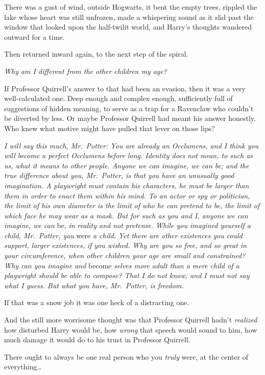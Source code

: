 There was a gust of wind, outside Hogwarts, it bent the empty trees, rippled 
the lake whose heart was still unfrozen, made a whispering sound as it slid 
past the window that looked upon the half-twilit world, and Harry's thoughts 
wandered outward for a time.

Then returned inward again, to the next step of the spiral.

\emph{Why am I different from the other children my age?}

If Professor Quirrell's answer to that had been an evasion, then it was a very 
well-calculated one. Deep enough and complex enough, sufficiently full of 
suggestions of hidden meaning, to serve as a trap for a Ravenclaw who couldn't 
be diverted by less. Or maybe Professor Quirrell had meant his answer honestly. 
Who knew what motive might have pulled that lever on those lips?

\emph{I will say this much, Mr.~Potter: You are already an Occlumens, and I 
think you will become a perfect Occlumens before long. Identity does not mean, 
to such as us, what it means to other people. Anyone we can imagine, we can be; 
and the true difference about you, Mr.~Potter, is that you have an unusually 
good imagination. A playwright must contain his characters, he must be larger 
than them in order to enact them within his mind. To an actor or spy or 
politician, the limit of his own diameter is the limit of who he can pretend to 
be, the limit of which face he may wear as a mask. But for such as you and I, 
anyone we can imagine, we can} be,\emph{ in reality and not pretense. While you 
imagined yourself a child, Mr.~Potter, you} were\emph{ a child. Yet there are 
other existences you could support, larger existences, if you wished. Why are 
you so free, and so great in your circumference, when other children your age 
are small and constrained? Why can you imagine and} become\emph{ selves more 
adult than a mere child of a playwright should be able to compose? That I do 
not know, and I must not say what I guess. But what you have, Mr.~Potter, is 
freedom.}

If that was a snow job it was one heck of a distracting one.

And the still more worrisome thought was that Professor Quirrell hadn't 
\emph{realized} how disturbed Harry would be, how \emph{wrong} that speech 
would sound to him, how much damage it would do to his trust in Professor 
Quirrell.

There ought to always be one real person who you \emph{truly} were, at the 
center of everything{\ldots}

